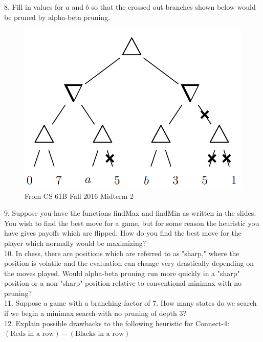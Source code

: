 \documentclass[12pt, letterpaper]{article}
\begin{document}
8. Fill in values for $a$ and $b$ so that the crossed out branches shown below would be pruned by alpha-beta pruning.
\begin{figure}[H]
    \centering
    \includegraphics[scale=0.3]{alpha-beta-prob.png}
    \caption*{From CS 61B Fall 2016 Midterm 2}
\end{figure}


9. Suppose you have the functions findMax and findMin as written in the slides. You wish to find the best move for a game, but for some reason the heuristic you have gives payoffs which are flipped. How do you find the best move for the player which normally would be maximizing? \\

10. In chess, there are positions which are referred to as "sharp," where the position is volatile and the evaluation can change very drastically depending on the moves played. Would alpha-beta pruning run more quickly in a "sharp" position or a non-"sharp" position relative to conventional minimax with no pruning? \\

11. Suppose a game with a branching factor of 7. How many states do we search if we begin a minimax search with no pruning of depth 3? \\

12. Explain possible drawbacks to the following heuristic for Connect-4: $(\text{Reds in a row}) - (\text{Blacks in a row})$
\end{document}
